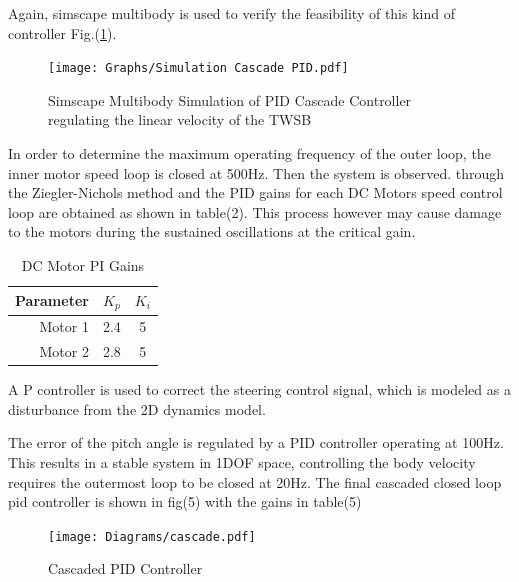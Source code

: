         Again, simscape multibody is used to verify the feasibility of this kind of controller Fig.(\ref{fig:SimPID}).
        \begin{figure}[H]
            \centering
            \texttt{[image: Graphs/Simulation Cascade PID.pdf]}
            \caption{Simscape Multibody Simulation of PID Cascade Controller regulating the linear velocity of the TWSB}
            \label{fig:SimPID}
        \end{figure}

        In order to determine the maximum operating frequency of the outer loop, 
        the inner motor speed loop is closed at 500Hz. Then the system is observed.
        through the Ziegler-Nichols method and the PID gains for each DC Motors speed control loop 
        are obtained as shown in table(2). This process however may cause damage to the motors 
        during the sustained oscillations at the critical gain. 
       
        \begin{table}[H]
            \centering
            \begin{tabular}{|r|c|c|}
                \hline
                Parameter & $K_p$ & $K_i$ \\
                \hline
                Motor 1 & 2.4 & 5 \\
                Motor 2 & 2.8 & 5 \\
                \hline
            \end{tabular}
            \caption{DC Motor PI Gains}
        \end{table}

        A P controller is used to correct the steering control signal, which  is modeled
        as a disturbance from the 2D dynamics model.

        The error of the pitch angle is regulated by a PID controller operating at 100Hz.
        This results in a stable system in 1DOF space, controlling the body velocity requires the outermost loop to be closed at 20Hz.
        The final cascaded closed loop pid controller is shown in fig(5) with the gains in table(5)

        \begin{figure}[H]
            \texttt{[image: Diagrams/cascade.pdf]}
            \caption{Cascaded PID Controller}
        \end{figure}

